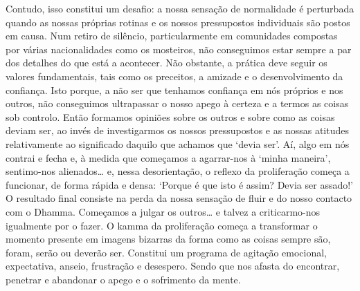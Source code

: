 Contudo, isso constitui um desafio: a nossa sensação de normalidade é perturbada quando as nossas próprias rotinas e os nossos pressupostos individuais são postos em causa. Num retiro de silêncio, particularmente em comunidades compostas por várias nacionalidades como os mosteiros, não conseguimos estar sempre a par dos detalhes do que está a acontecer. Não obstante, a prática deve seguir os valores fundamentais, tais como os preceitos, a amizade e o desenvolvimento da confiança. Isto porque, a não ser que tenhamos confiança em nós próprios e nos outros, não conseguimos ultrapassar o nosso apego à certeza e a termos as coisas sob controlo. Então formamos opiniões sobre os outros e sobre como as coisas deviam ser, ao invés de investigarmos os nossos pressupostos e as nossas atitudes relativamente ao significado daquilo que achamos que `devia ser'. Aí, algo em nós contrai e fecha e, à medida que começamos a agarrar-nos à `minha maneira', sentimo-nos alienados\ldots{} e, nessa desorientação, o reflexo da proliferação começa a funcionar, de forma rápida e densa: `Porque é que isto é assim? Devia ser assado!' O resultado final consiste na perda da nossa sensação de fluir e do nosso contacto com o Dhamma. Começamos a julgar os outros\ldots{} e talvez a criticarmo-nos igualmente por o fazer. O kamma da proliferação começa a transformar o momento presente em imagens bizarras da forma como as coisas sempre são, foram, serão ou deverão ser. Constitui um programa de agitação emocional, expectativa, anseio, frustração e desespero. Sendo que nos afasta do encontrar, penetrar e abandonar o apego e o sofrimento da mente.

